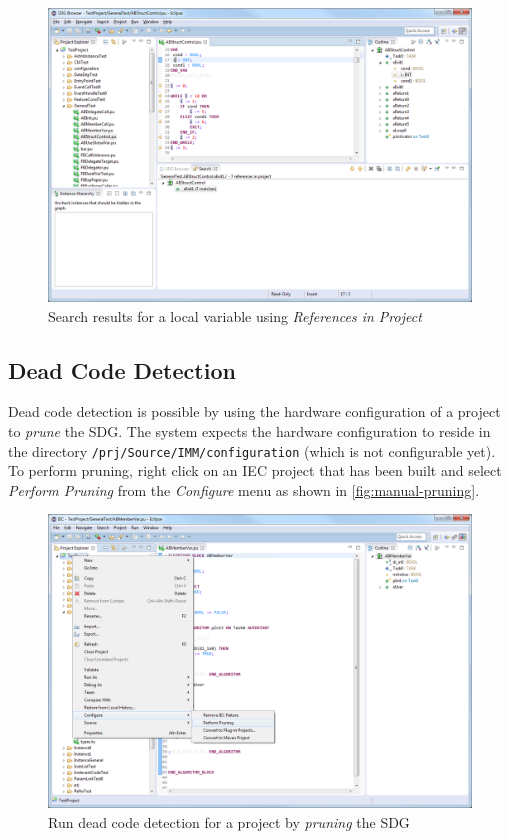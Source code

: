 \begin{figure}[p]
  \centering
    \includegraphics[width=\textwidth]{bilder/manual-search}
  \caption{Search results for a local variable using \emph{References in Project}}
  \label{fig:manual-search}
\end{figure}

\subsection{Dead Code Detection}

Dead code detection is possible by using the hardware configuration of a project to \emph{prune} the SDG. The system 
expects the hardware configuration to reside in the directory \texttt{/prj/Source/IMM/configuration} (which is not 
configurable yet). To perform pruning, right click on an IEC project that has been built and select \emph{Perform 
Pruning} from the \emph{Configure} menu as shown in \autoref{fig:manual-pruning}.

\begin{figure}[htp]
  \centering
    \includegraphics[width=\textwidth]{bilder/manual-pruning}
  \caption{Run dead code detection for a project by \emph{pruning} the SDG}
  \label{fig:manual-pruning}
\end{figure}


